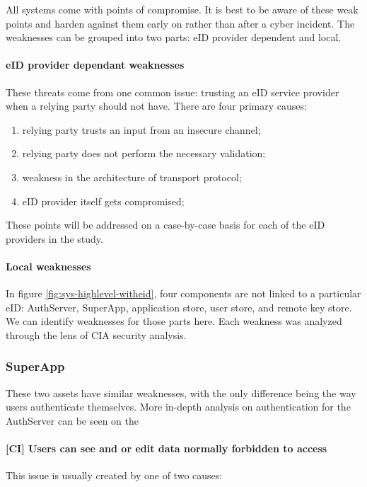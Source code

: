 All systems come with points of compromise. It is best to be aware of these weak points and harden against them early on rather than after a cyber incident. The weaknesses can be grouped into two parts: eID provider dependent and local.

\paragraph{eID provider dependant weaknesses}

These threats come from one common issue: trusting an eID service provider when a relying party should not have. There are four primary causes:

\begin{enumerate}
  \item relying party trusts an input from an insecure channel;
  \item relying party does not perform the necessary validation;
  \item weakness in the architecture of transport protocol;
  \item eID provider itself gets compromised;
\end{enumerate}

These points will be addressed on a case-by-case basis for each of the eID providers in the study.

\paragraph{Local weaknesses}

In figure \ref{fig:sys-highlevel-witheid}, four components are not linked to a particular eID: AuthServer, SuperApp, application store, user store, and remote key store. We can identify weaknesses for those parts here. Each weakness was analyzed through the lens of CIA security analysis.


\subsubsection{SuperApp}

These two assets have similar weaknesses, with the only difference being the way users authenticate themselves. More in-depth analysis on authentication for the AuthServer can be seen on the

\paragraph{[CI] Users can see and or edit data normally forbidden to access} This issue is usually created by one of two causes:

